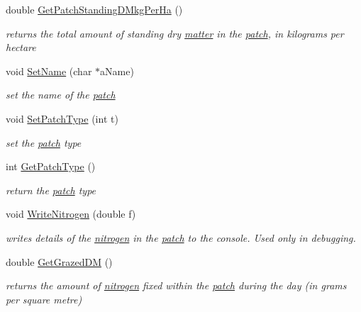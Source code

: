 \begin{DoxyCompactItemize}
double \hyperlink{classpatch_a7acb474f81652d0f068fec53e4f39820}{GetPatchStandingDMkgPerHa} ()
\begin{DoxyCompactList}\small\item\em returns the total amount of standing dry \hyperlink{classmatter}{matter} in the \hyperlink{classpatch}{patch}, in kilograms per hectare \item\end{DoxyCompactList}\item 
void \hyperlink{classpatch_aaa76dd5410cb800bd5281d2cc13d5807}{SetName} (char $\ast$aName)
\begin{DoxyCompactList}\small\item\em set the name of the \hyperlink{classpatch}{patch} \item\end{DoxyCompactList}\item 
void \hyperlink{classpatch_aed1dc764e72357aafb106b81fec5e703}{SetPatchType} (int t)
\begin{DoxyCompactList}\small\item\em set the \hyperlink{classpatch}{patch} type \item\end{DoxyCompactList}\item 
int \hyperlink{classpatch_a6bafafe564eadfc87a06315e01402444}{GetPatchType} ()
\begin{DoxyCompactList}\small\item\em return the \hyperlink{classpatch}{patch} type \item\end{DoxyCompactList}\item 
void \hyperlink{classpatch_adee8003561555e32b46f06fff7d5381b}{WriteNitrogen} (double f)
\begin{DoxyCompactList}\small\item\em writes details of the \hyperlink{classnitrogen}{nitrogen} in the \hyperlink{classpatch}{patch} to the console. Used only in debugging. \item\end{DoxyCompactList}\item 
double \hyperlink{classpatch_a84e0930d2c8a6a1e7bf77ae86d6de1ab}{GetGrazedDM} ()
\begin{DoxyCompactList}\small\item\em returns the amount of \hyperlink{classnitrogen}{nitrogen} fixed within the \hyperlink{classpatch}{patch} during the day (in grams per square metre) \item\end{DoxyCompactList}\item 

\end{DoxyCompactItemize}

